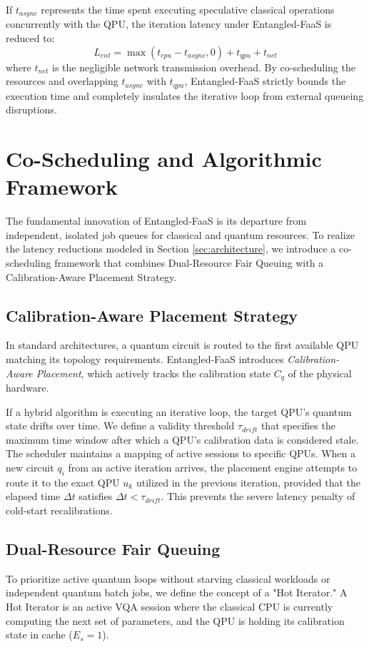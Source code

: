 \documentclass[conference]{IEEEtran}
\begin{document}
If $t_{async}$ represents the time spent executing speculative classical operations concurrently with the QPU, the iteration latency under Entangled-FaaS is reduced to:
\begin{equation}
    L_{ent} = \max(t_{cpu} - t_{async}, 0) + t_{qpu} + t_{net}
\end{equation}
where $t_{net}$ is the negligible network transmission overhead. By co-scheduling the resources and overlapping $t_{async}$ with $t_{qpu}$, Entangled-FaaS strictly bounds the execution time and completely insulates the iterative loop from external queueing disruptions.



\section{Co-Scheduling and Algorithmic Framework}
\label{sec:scheduling}

The fundamental innovation of Entangled-FaaS is its departure from independent, isolated job queues for classical and quantum resources. To realize the latency reductions modeled in Section \ref{sec:architecture}, we introduce a co-scheduling framework that combines Dual-Resource Fair Queuing with a Calibration-Aware Placement Strategy.

\subsection{Calibration-Aware Placement Strategy}
In standard architectures, a quantum circuit is routed to the first available QPU matching its topology requirements. Entangled-FaaS introduces \textit{Calibration-Aware Placement}, which actively tracks the calibration state $C_q$ of the physical hardware. 

If a hybrid algorithm is executing an iterative loop, the target QPU's quantum state drifts over time. We define a validity threshold $\tau_{drift}$ that specifies the maximum time window after which a QPU's calibration data is considered stale. The scheduler maintains a mapping of active sessions to specific QPUs. When a new circuit $q_i$ from an active iteration arrives, the placement engine attempts to route it to the exact QPU $u_k$ utilized in the previous iteration, provided that the elapsed time $\Delta t$ satisfies $\Delta t < \tau_{drift}$. This prevents the severe latency penalty of cold-start recalibrations.

\subsection{Dual-Resource Fair Queuing}
To prioritize active quantum loops without starving classical workloads or independent quantum batch jobs, we define the concept of a "Hot Iterator." A Hot Iterator is an active VQA session where the classical CPU is currently computing the next set of parameters, and the QPU is holding its calibration state in cache ($E_s = 1$).
\end{document}
